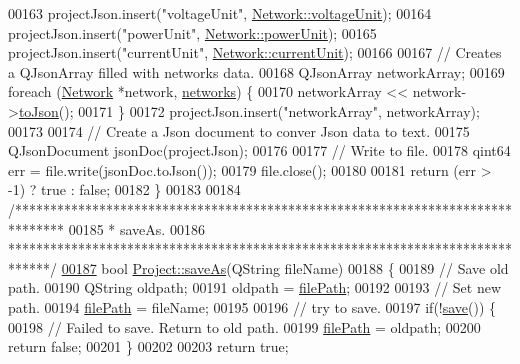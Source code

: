 \begin{DoxyCode}
00163   projectJson.insert(\textcolor{stringliteral}{"voltageUnit"}, \hyperlink{group___models_gacde031ef95f5c05565ee35769f2ed89e}{Network::voltageUnit});
00164   projectJson.insert(\textcolor{stringliteral}{"powerUnit"}, \hyperlink{group___models_ga9504015bc566f4a3d3b4d4a86000293b}{Network::powerUnit});
00165   projectJson.insert(\textcolor{stringliteral}{"currentUnit"}, \hyperlink{group___models_gac6a26db5fef2b1dd2a00faf6340d1702}{Network::currentUnit});
00166 
00167   \textcolor{comment}{// Creates a QJsonArray filled with networks data.}
00168   QJsonArray networkArray;
00169   \textcolor{keywordflow}{foreach} (\hyperlink{class_network}{Network} *network, \hyperlink{class_project_aa98126154cab59769a431668e6f17daf}{networks}) \{
00170     networkArray << network->\hyperlink{group___models_ga1bb9773d3935eefef84136d388786494}{toJson}();
00171   \}
00172   projectJson.insert(\textcolor{stringliteral}{"networkArray"}, networkArray);
00173 
00174   \textcolor{comment}{// Create a Json document to conver Json data to text.}
00175   QJsonDocument jsonDoc(projectJson);
00176 
00177   \textcolor{comment}{// Write to file.}
00178   qint64 err = file.write(jsonDoc.toJson());
00179   file.close();
00180 
00181   \textcolor{keywordflow}{return} (err > -1) ? \textcolor{keyword}{true} : \textcolor{keyword}{false};
00182 \}
00183 
00184 \textcolor{comment}{/*******************************************************************************}
00185 \textcolor{comment}{ * saveAs.}
00186 \textcolor{comment}{ ******************************************************************************/}
\hypertarget{project_8cpp_source_l00187}{}\hyperlink{class_project_ad32a31d548ad38f4cbbe0f95879a68e5}{00187} \textcolor{keywordtype}{bool} \hyperlink{class_project_ad32a31d548ad38f4cbbe0f95879a68e5}{Project::saveAs}(QString fileName)
00188 \{
00189   \textcolor{comment}{// Save old path.}
00190   QString oldpath;
00191   oldpath = \hyperlink{class_project_a79f30adcefd0b72bd4ac7db724bc9531}{filePath};
00192 
00193   \textcolor{comment}{// Set new path.}
00194   \hyperlink{class_project_a79f30adcefd0b72bd4ac7db724bc9531}{filePath} = fileName;
00195 
00196   \textcolor{comment}{// try to save.}
00197   \textcolor{keywordflow}{if}(!\hyperlink{class_project_a596a875bc5be73bc5b1b71b6448c1e07}{save}()) \{
00198     \textcolor{comment}{// Failed to save. Return to old path.}
00199     \hyperlink{class_project_a79f30adcefd0b72bd4ac7db724bc9531}{filePath} = oldpath;
00200     \textcolor{keywordflow}{return} \textcolor{keyword}{false};
00201   \}
00202 
00203   \textcolor{keywordflow}{return} \textcolor{keyword}{true};

\end{DoxyCode}
